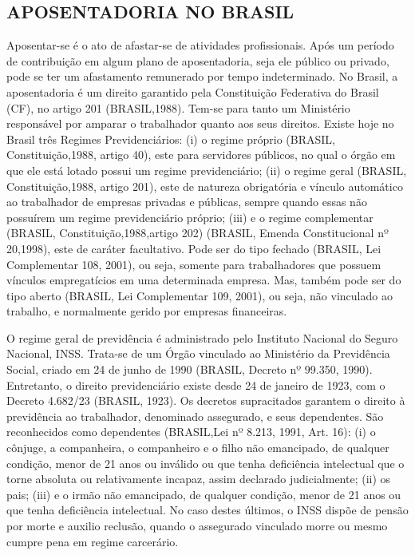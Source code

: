 
\begin{apendicesenv}

\partapendices

\chapter{APOSENTADORIA NO BRASIL}

Aposentar-se é o ato de afastar-se de atividades profissionais. Após um período de contribuição em algum plano de aposentadoria, seja ele público ou privado, pode se ter um afastamento remunerado por tempo indeterminado. No Brasil, a aposentadoria é um direito garantido pela Constituição Federativa do Brasil (CF), no artigo 201 (BRASIL,1988). Tem-se para tanto um Ministério responsável por amparar o trabalhador quanto aos seus direitos. Existe hoje no Brasil três Regimes Previdenciários: (i) o regime próprio (BRASIL, Constituição,1988, artigo 40), este para servidores públicos, no qual o órgão em que ele está lotado possui um regime previdenciário; (ii) o regime geral (BRASIL, Constituição,1988, artigo 201), este de natureza obrigatória e vínculo automático ao trabalhador de empresas privadas e públicas, sempre quando essas não possuírem um regime previdenciário próprio; (iii) e o regime complementar (BRASIL, Constituição,1988,artigo 202) (BRASIL, Emenda Constitucional nº 20,1998), este de caráter facultativo. Pode ser do tipo fechado (BRASIL, Lei Complementar 108, 2001), ou seja, somente para trabalhadores que possuem vínculos empregatícios em uma determinada empresa. Mas, também pode ser do tipo aberto (BRASIL, Lei Complementar 109, 2001), ou seja, não vinculado ao trabalho, e normalmente gerido por empresas financeiras.

O regime geral de previdência é administrado pelo Instituto Nacional do Seguro Nacional, INSS. Trata-se de um Órgão vinculado ao Ministério da Previdência Social, criado em 24 de junho de 1990 (BRASIL, Decreto nº 99.350, 1990). Entretanto, o direito previdenciário existe desde 24 de janeiro de 1923, com o Decreto 4.682/23 (BRASIL, 1923). Os decretos supracitados garantem o direito à previdência ao trabalhador, denominado assegurado, e seus dependentes. São reconhecidos como dependentes (BRASIL,Lei nº 8.213, 1991, Art. 16): (i) o cônjuge, a companheira, o companheiro e o filho não emancipado, de qualquer condição, menor de 21 anos ou inválido ou que tenha deficiência intelectual que o torne absoluta ou relativamente incapaz, assim declarado judicialmente; (ii) os pais; (iii) e o irmão não emancipado, de qualquer condição, menor de 21 anos ou que tenha deficiência intelectual. No caso destes últimos, o INSS dispõe de pensão por morte e auxilio reclusão, quando o assegurado vinculado morre ou mesmo cumpre pena em regime carcerário.


\end{apendicesenv}
